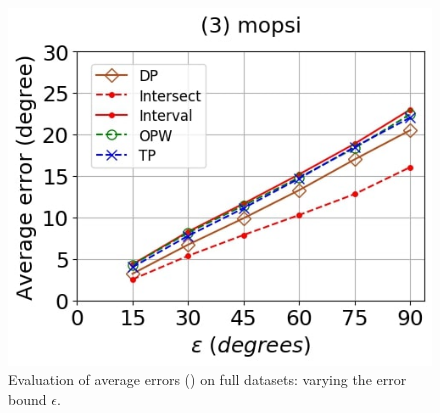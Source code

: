\begin{figure}[tb!]
	\includegraphics[scale=0.250]{Figures/Exp-DAD-error-epsilon-mopsi.jpg}	
	\vspace{-2ex}
	\caption{\small Evaluation of average errors (\dad) on full datasets: varying the error bound $\epsilon$.}
	\label{fig:ae-dad-epsilon}
	\vspace{-2ex}
\end{figure}




